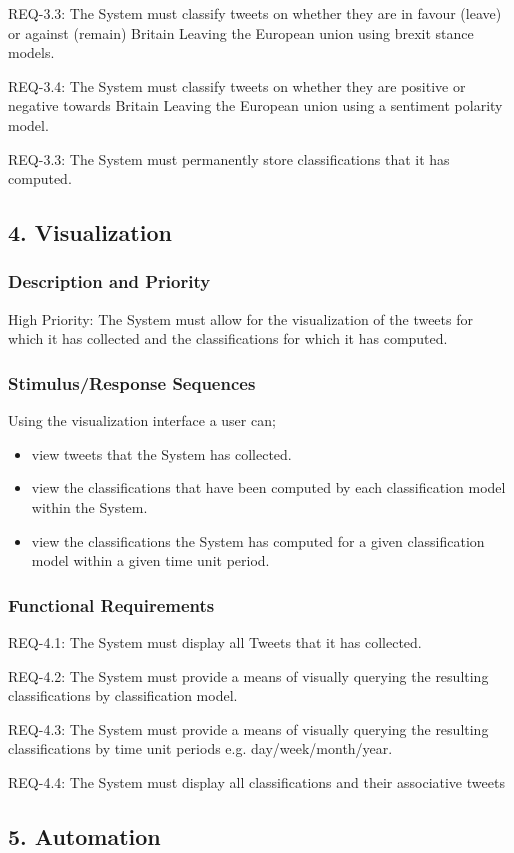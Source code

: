 \documentclass[11pt]{report}
\begin{document}
REQ-3.3: The System must classify tweets on whether they are in favour (leave) or against (remain)  Britain Leaving the European union using brexit stance models.

REQ-3.4: The System must classify tweets on whether they are positive or negative towards Britain Leaving the European union using a sentiment polarity model.

REQ-3.3: The System must permanently store classifications that it has computed.

\subsection*{4. Visualization}
\subsubsection*{Description and Priority}
High Priority: The System must allow for the visualization of the tweets for which it has collected and the classifications for which it has computed.
\subsubsection*{Stimulus/Response Sequences}
Using the visualization interface a user can; 
\begin{itemize}
\item view tweets that the System has collected.
\item view the classifications that have been computed by each classification model within the System.
\item view the classifications the System has computed for a given classification model within a given time unit period.
\end{itemize}
\subsubsection*{Functional Requirements}
REQ-4.1: The System must display all Tweets that it has collected.

REQ-4.2: The System must provide a means of visually querying the resulting classifications by classification model.

REQ-4.3: The System must provide a means of visually querying the resulting classifications by time unit periods e.g. day/week/month/year.

REQ-4.4: The System must display all classifications and their associative tweets

\subsection*{5. Automation}
\end{document}
